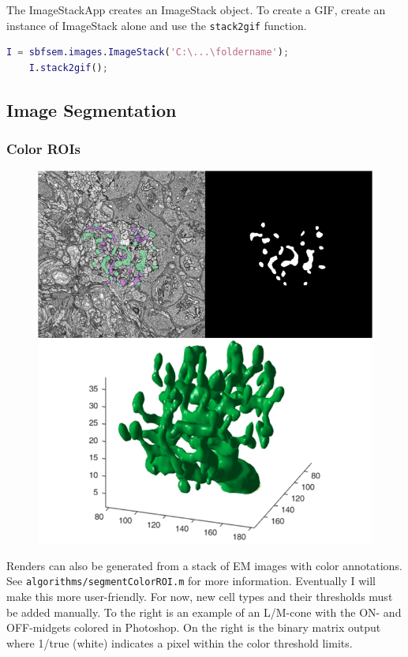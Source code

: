 \documentclass[12pt]{exam}
\begin{document}
	The ImageStackApp creates an ImageStack object. To create a GIF, create an instance of ImageStack alone and use the \texttt{stack2gif} function. 
	\begin{lstlisting}[language=matlab]
	I = sbfsem.images.ImageStack('C:\...\foldername');
	I.stack2gif();\end{lstlisting}
	\subsection{Image Segmentation}
	\subsubsection{Color ROIs}\label{colorROI}
	\begin{figure}
		\includegraphics[width=\linewidth]{roi_render}
		\label{colorROI}
	\end{figure}
	Renders can also be generated from a stack of EM images with color annotations. See \texttt{algorithms/segmentColorROI.m} for more information. Eventually I will make this more user-friendly. For now, new cell types and their thresholds must be added manually. To the right is an example of an L/M-cone with the ON- and OFF-midgets colored in Photoshop. On the right is the binary matrix output where 1/true (white) indicates a pixel within the color threshold limits.
\end{document}

